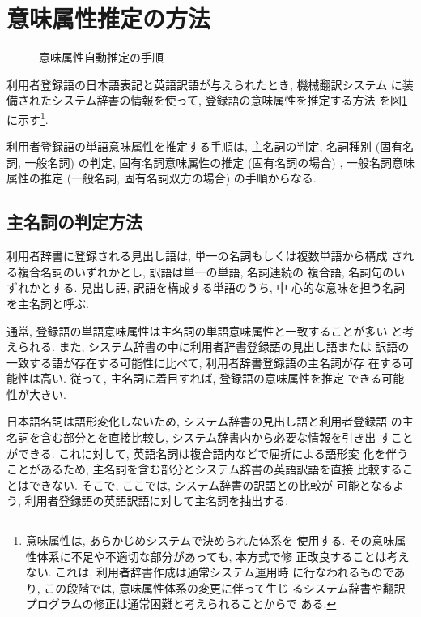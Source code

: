 \section{意味属性推定の方法}
\label{sec:3}

{\unitlength=1mm
\begin{figure}[htbp]
  \begin{center}
    
    
    
  \end{center}
  \caption{意味属性自動推定の手順}
  \label{fig:2}
\end{figure}
}

利用者登録語の日本語表記と英語訳語が与えられたとき, 機械翻訳システム
に装備されたシステム辞書の情報を使って, 登録語の意味属性を推定する方法
を図\ref{fig:2}に示す\footnote{意味属性は, あらかじめシステムで決められた体系を
使用する. その意味属性体系に不足や不適切な部分があっても, 本方式で修
正改良することは考えない. これは, 利用者辞書作成は通常システム運用時
に行なわれるものであり, この段階では, 意味属性体系の変更に伴って生じ
るシステム辞書や翻訳プログラムの修正は通常困難と考えられることからで
ある. }.  

利用者登録語の単語意味属性を推定する手順は, 主名詞の判定, 名詞種別
 (固有名詞, 一般名詞) の判定, 固有名詞意味属性の推定 (固有名詞の場合) , 
一般名詞意味属性の推定 (一般名詞, 固有名詞双方の場合) の手順からなる.  



\subsection{主名詞の判定方法}
\label{sec:3.1}

利用者辞書に登録される見出し語は, 単一の名詞もしくは複数単語から構成
される複合名詞のいずれかとし, 訳語は単一の単語, 名詞連続の
複合語, 名詞句のいずれかとする. 見出し語, 訳語を構成する単語のうち, 中
心的な意味を担う名詞を主名詞と呼ぶ.  

通常, 登録語の単語意味属性は主名詞の単語意味属性と一致することが多い
と考えられる. また, システム辞書の中に利用者辞書登録語の見出し語または
訳語の一致する語が存在する可能性に比べて, 利用者辞書登録語の主名詞が存
在する可能性は高い. 従って, 主名詞に着目すれば, 登録語の意味属性を推定
できる可能性が大きい.  

日本語名詞は語形変化しないため, システム辞書の見出し語と利用者登録語
の主名詞を含む部分とを直接比較し, システム辞書内から必要な情報を引き出
すことができる. これに対して, 英語名詞は複合語内などで屈折による語形変
化を伴うことがあるため, 主名詞を含む部分とシステム辞書の英語訳語を直接
比較することはできない. そこで, ここでは, システム辞書の訳語との比較が
可能となるよう, 利用者登録語の英語訳語に対して主名詞を抽出する.  

